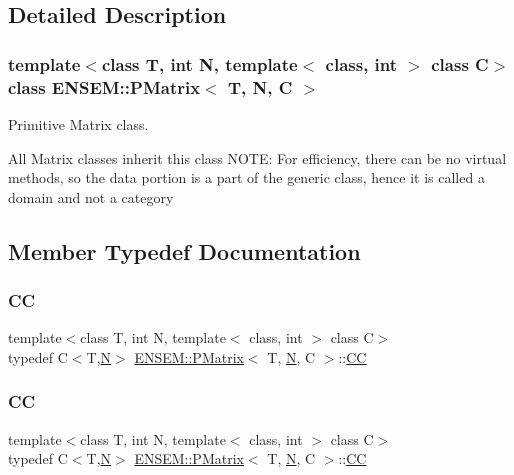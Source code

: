 \subsection{Detailed Description}
\subsubsection*{template$<$class T, int N, template$<$ class, int $>$ class C$>$\newline
class E\+N\+S\+E\+M\+::\+P\+Matrix$<$ T, N, C $>$}

Primitive Matrix class. 

All Matrix classes inherit this class N\+O\+TE\+: For efficiency, there can be no virtual methods, so the data portion is a part of the generic class, hence it is called a domain and not a category 

\subsection{Member Typedef Documentation}
\mbox{\label{classENSEM_1_1PMatrix_a744bac549029029effe32dc1705660ec}} 
\subsubsection{\texorpdfstring{CC}{CC}\hspace{0.1cm}{\footnotesize\ttfamily [1/3]}}
{\footnotesize\ttfamily template$<$class T, int N, template$<$ class, int $>$ class C$>$ \\
typedef C$<$T,\mbox{\hyperlink{adat__devel_2lib_2hadron_2operator__name__util_8cc_a7722c8ecbb62d99aee7ce68b1752f337}{N}}$>$ \mbox{\hyperlink{classENSEM_1_1PMatrix}{E\+N\+S\+E\+M\+::\+P\+Matrix}}$<$ T, \mbox{\hyperlink{adat__devel_2lib_2hadron_2operator__name__util_8cc_a7722c8ecbb62d99aee7ce68b1752f337}{N}}, C $>$\+::\mbox{\hyperlink{classENSEM_1_1PMatrix_a744bac549029029effe32dc1705660ec}{CC}}}

\mbox{\label{classENSEM_1_1PMatrix_a744bac549029029effe32dc1705660ec}} 
\subsubsection{\texorpdfstring{CC}{CC}\hspace{0.1cm}{\footnotesize\ttfamily [2/3]}}
{\footnotesize\ttfamily template$<$class T, int N, template$<$ class, int $>$ class C$>$ \\
typedef C$<$T,\mbox{\hyperlink{adat__devel_2lib_2hadron_2operator__name__util_8cc_a7722c8ecbb62d99aee7ce68b1752f337}{N}}$>$ \mbox{\hyperlink{classENSEM_1_1PMatrix}{E\+N\+S\+E\+M\+::\+P\+Matrix}}$<$ T, \mbox{\hyperlink{adat__devel_2lib_2hadron_2operator__name__util_8cc_a7722c8ecbb62d99aee7ce68b1752f337}{N}}, C $>$\+::\mbox{\hyperlink{classENSEM_1_1PMatrix_a744bac549029029effe32dc1705660ec}{CC}}}

